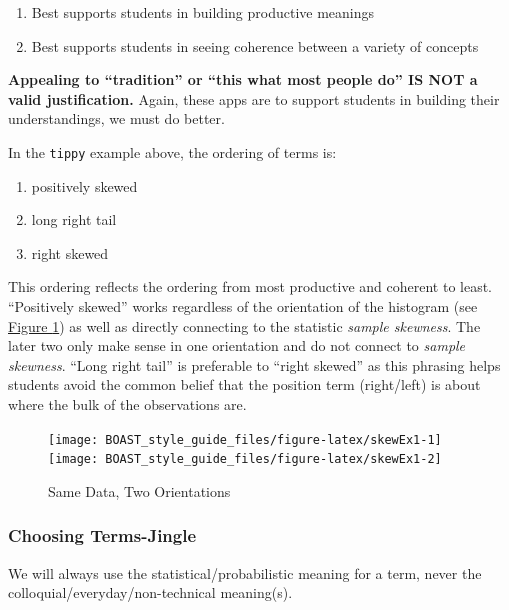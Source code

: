 \documentclass[
]{book}
\providecommand{\tightlist}{%
  \setlength{\itemsep}{0pt}\setlength{\parskip}{0pt}}
\begin{document}
\begin{enumerate}
\def\labelenumi{\arabic{enumi}.}
\tightlist
\item
  Best supports students in building productive meanings
\item
  Best supports students in seeing coherence between a variety of concepts
\end{enumerate}

\textbf{Appealing to ``tradition'' or ``this what most people do'' IS NOT a valid justification.} Again, these apps are to support students in building their understandings, we must do better.

In the \texttt{tippy} example above, the ordering of terms is:

\begin{enumerate}
\def\labelenumi{\arabic{enumi}.}
\tightlist
\item
  positively skewed
\item
  long right tail
\item
  right skewed
\end{enumerate}

This ordering reflects the ordering from most productive and coherent to least. ``Positively skewed'' works regardless of the orientation of the histogram (see \protect\hyperlink{fig:skewEx1}{Figure \ref{fig:skewEx1}}) as well as directly connecting to the statistic \emph{sample skewness}. The later two only make sense in one orientation and do not connect to \emph{sample skewness}. ``Long right tail'' is preferable to ``right skewed'' as this phrasing helps students avoid the common belief that the position term (right/left) is about where the bulk of the observations are.

\begin{figure}

{\centering \texttt{[image: BOAST\_style\_guide\_files/figure-latex/skewEx1-1]} \texttt{[image: BOAST\_style\_guide\_files/figure-latex/skewEx1-2]} 

}

\caption{Same Data, Two Orientations}\label{fig:skewEx1}
\end{figure}

\hypertarget{choosing-terms-jingle}{%
\subsubsection{Choosing Terms-Jingle}\label{choosing-terms-jingle}}

We will always use the statistical/probabilistic meaning for a term, never the colloquial/everyday/non-technical meaning(s).
\end{document}
